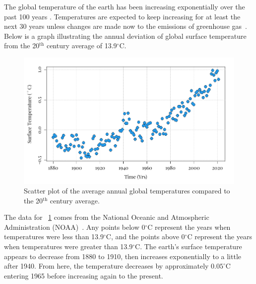 The global temperature of the earth has been increasing exponentially over the past 100 years \cite{crowley2000causes}. 
Temperatures are expected to keep increasing for at least the next 30 years unless changes are made now to the emissions of greenhouse gas~\cite{UCAR,university_of_alaska_2016}.
Below is a graph illustrating the annual deviation of global surface temperature from the 20$^{\text{th}}$ century average of 13.9$^{\circ}$C.
\begin{figure}[H]
    \centering
    \includegraphics[width=14cm]{LaTeX/Pictures/SST/Global Temp.png}
    \caption{\singlespacing
    Scatter plot of the average annual global temperatures compared to the 20$^{\text{th}}$ century average.}
    \label{fig:noaasurf}
\end{figure}
The data for \figureautorefname~\ref{fig:noaasurf} comes from the National Oceanic and Atmospheric Administration (NOAA)~\cite{NOAA}. 
Any points below 0$^{\circ}$C represent the years when temperatures were less than 13.9$^{\circ}$C, and the points above 0$^{\circ}$C represent the years when temperatures were greater than 13.9$^{\circ}$C.
The earth's surface temperature appears to decrease from 1880 to 1910, then increases exponentially to a little after 1940.
From here, the temperature decreases by approximately $0.05^{\circ}$C entering 1965 before increasing again to the present.
